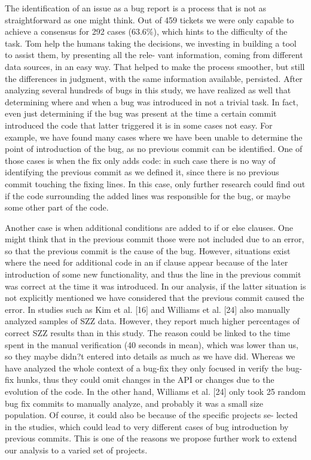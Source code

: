 \documentclass[a4paper, 12pt]{book}
\begin{document}
The identification of an issue as a bug report is a process that is not as straightforward as one might think. Out of 459 tickets we were only capable to achieve a consensus for 292 cases (63.6\%), which hints to the difficulty of the task. Tom help the humans taking the decisions, we investing in building a tool to assist them, by presenting all the rele- vant information, coming from different data sources, in an easy way. That helped to make the process smoother, but still the differences in judgment, with the same information available, persisted.
After analyzing several hundreds of bugs in this study, we have realized as well that determining where and when a bug was introduced in not a trivial task. In fact, even just determining if the bug was present at the time a certain commit introduced the code that latter triggered it is in some cases not easy.
For example, we have found many cases where we have been unable to determine the point of introduction of the bug, as no previous commit can be identified. One of those cases is when the fix only adds code: in such case there is no way of identifying the previous commit as we defined it, since there is no previous commit touching the fixing lines. In this case, only further research could find out if the code surrounding the added lines was responsible for the bug, or maybe some other part of the code.

Another case is when additional conditions are added to if or else clauses. One might think that in the previous commit those were not included due to an error, so that the previous commit is the cause of the bug. However, situations exist where the need for additional code in an if clause appear because of the later introduction of some new functionality, and thus the line in the previous commit was correct at the time it was introduced. In our analysis, if the latter situation is not explicitly mentioned we have considered that the previous commit caused the error.
In studies such as Kim et al. [16] and Williams et al. [24] also manually analyzed samples of SZZ data. However, they report much higher percentages of correct SZZ results than in this study. The reason could be linked to the time spent in the manual verification (40 seconds in mean), which was lower than us, so they maybe didn?t entered into details as much as we have did. Whereas we have analyzed the whole context of a bug-fix they only focused in verify the bug-fix hunks, thus they could omit changes in the API or changes due to the evolution of the code. In the other hand, Williams et al. [24] only took 25 random bug fix commits to manually analyze, and probably it was a small size population. Of course, it could also be because of the specific projects se- lected in the studies, which could lead to very different cases of bug introduction by previous commits. This is one of the reasons we propose further work to extend our analysis to a varied set of projects.
\end{document}
